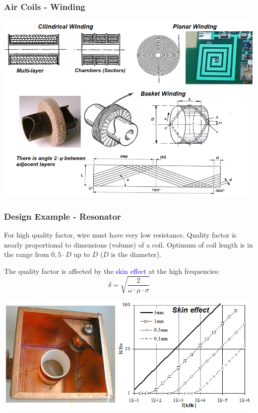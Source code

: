 \documentclass{beamer}
\begin{document}
	\begin{frame}
	\frametitle{Air Coils - Winding}
	\begin{center}
		\includegraphics[scale=0.35]{obr05_vzdVinuti.png}
	\end{center}
  \end{frame}
	\begin{frame}
	\frametitle{Design Example - Resonator}
	\small
	\begin{flushleft}
		For high quality factor, wire must have very low resistance. Quality factor is nearly proportional to dimensions (volume) of a coil. Optimum of coil length is in the range from $0,5\cdot D$ up to $D$ ($D$ is the diameter).
	\end{flushleft}
	\begin{flushleft}
		The quality factor is affected by the \textcolor{blue}{skin effect} at the high frequencies: $$\delta = \sqrt{\frac{2}{\omega\cdot \mu\cdot \sigma}}$$
	\end{flushleft}
	\begin{center}
		\includegraphics[scale=0.35]{obr06_Papez.png}
	\end{center}
  \end{frame}
\end{document}
